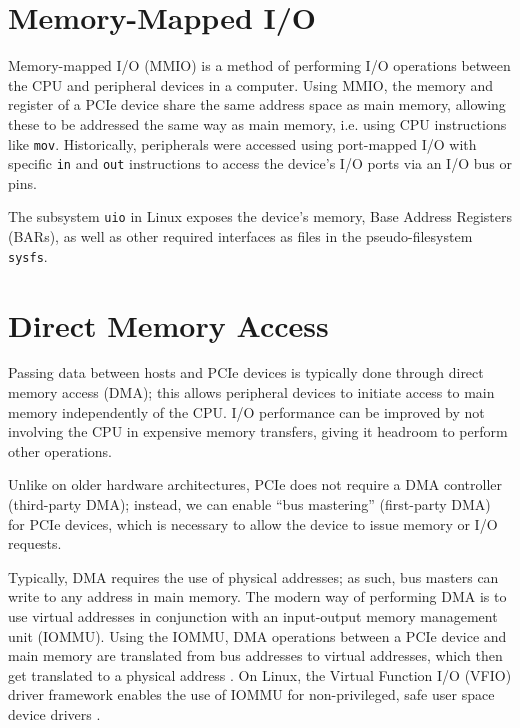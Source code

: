 

\section{Memory-Mapped I/O}
Memory-mapped I/O (MMIO) is a method of performing I/O operations between the CPU and peripheral devices in a computer. Using MMIO, the memory and register of a PCIe device share the same address space as main memory, allowing these to be addressed the same way as main memory, i.e. using CPU instructions like \texttt{mov}. Historically, peripherals were accessed using port-mapped I/O with specific \texttt{in} and \texttt{out} instructions to access the device's I/O ports via an I/O bus or pins.

The subsystem \texttt{uio} in Linux exposes the device's memory, Base Address Registers (BARs), as well as other required interfaces as files in the pseudo-filesystem \texttt{sysfs}.

\section{Direct Memory Access}
Passing data between hosts and PCIe devices is typically done through direct memory access (DMA); this allows peripheral devices to initiate access to main memory independently of the CPU. I/O performance can be improved by not involving the CPU in expensive memory transfers, giving it headroom to perform other operations.

Unlike on older hardware architectures, PCIe does not require a DMA controller (third-party DMA); instead, we can enable ``bus mastering'' (first-party DMA) for PCIe devices, which is necessary to allow the device to issue memory or I/O requests.

Typically, DMA requires the use of physical addresses; as such, bus masters can write to any address in main memory. The modern way of performing DMA is to use virtual addresses in conjunction with an input-output memory management unit (IOMMU). Using the IOMMU, DMA operations between a PCIe device and main memory are translated from bus addresses to virtual addresses, which then get translated to a physical address \cite{spdk-dma}. On Linux, the Virtual Function I/O (VFIO) driver framework enables the use of IOMMU for non-privileged, safe user space device drivers \cite{vfio}.


